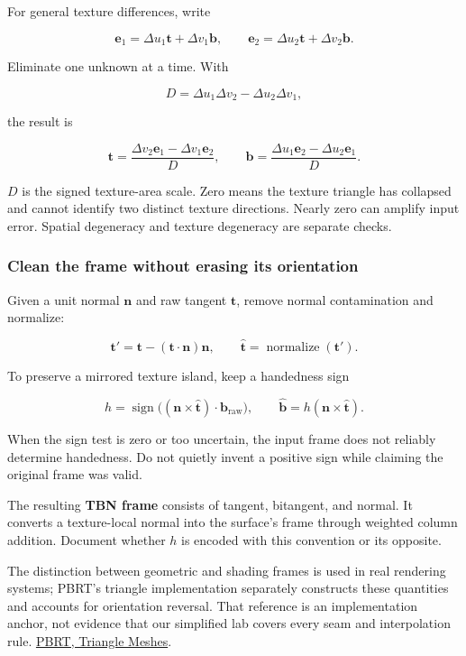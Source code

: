 For general texture differences, write

\[
\mathbf e_1=\Delta u_1\mathbf t+\Delta v_1\mathbf b,
\qquad
\mathbf e_2=\Delta u_2\mathbf t+\Delta v_2\mathbf b.
\]

Eliminate one unknown at a time. With

\[
D=\Delta u_1\Delta v_2-\Delta u_2\Delta v_1,
\]

the result is

\[
\mathbf t=\frac{\Delta v_2\mathbf e_1-\Delta v_1\mathbf e_2}{D},
\qquad
\mathbf b=\frac{\Delta u_1\mathbf e_2-\Delta u_2\mathbf e_1}{D}.
\]

\(D\) is the signed texture-area scale. Zero means the texture triangle has collapsed and cannot identify two distinct texture directions. Nearly zero can amplify input error. Spatial degeneracy and texture degeneracy are separate checks.

\subsubsection{Clean the frame without erasing its orientation}\label{01-foundations-i-ch017-clean-the-frame-without-erasing-its-orientation}

Given a unit normal \(\mathbf n\) and raw tangent \(\mathbf t\), remove normal contamination and normalize:

\[
\mathbf t'=\mathbf t-(\mathbf t\cdot\mathbf n)\mathbf n,
\qquad \widehat{\mathbf t}=\operatorname{normalize}(\mathbf t').
\]

To preserve a mirrored texture island, keep a handedness sign

\[
h=\operatorname{sign}\big((\mathbf n\times\widehat{\mathbf t})\cdot\mathbf b_{\mathrm{raw}}\big),
\qquad
\widehat{\mathbf b}=h(\mathbf n\times\widehat{\mathbf t}).
\]

When the sign test is zero or too uncertain, the input frame does not reliably determine handedness. Do not quietly invent a positive sign while claiming the original frame was valid.

The resulting \textbf{TBN frame} consists of tangent, bitangent, and normal. It converts a texture-local normal into the surface's frame through weighted column addition. Document whether \(h\) is encoded with this convention or its opposite.

The distinction between geometric and shading frames is used in real rendering systems; PBRT's triangle implementation separately constructs these quantities and accounts for orientation reversal. That reference is an implementation anchor, not evidence that our simplified lab covers every seam and interpolation rule. \href{https://www.pbr-book.org/4ed/Shapes/Triangle_Meshes}{PBRT, Triangle Meshes}.

